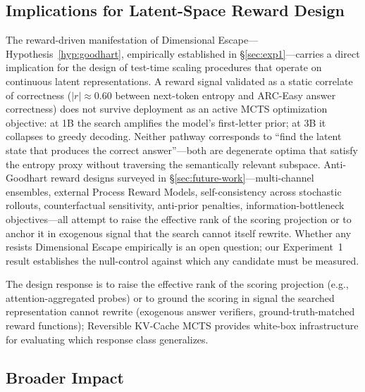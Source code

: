 \documentclass{article}
\begin{document}
\subsection{Implications for Latent-Space Reward Design}\label{sec:discussion-implications}

The reward-driven manifestation of Dimensional Escape---Hypothesis~\ref{hyp:goodhart}, empirically established in §\ref{sec:exp1}---carries a direct implication for the design of test-time scaling procedures that operate on continuous latent representations. A reward signal validated as a static correlate of correctness ($|r| \approx 0.60$ between next-token entropy and ARC-Easy answer correctness) does not survive deployment as an active MCTS optimization objective: at 1B the search amplifies the model's first-letter prior; at 3B it collapses to greedy decoding. Neither pathway corresponds to ``find the latent state that produces the correct answer''---both are degenerate optima that satisfy the entropy proxy without traversing the semantically relevant subspace. Anti-Goodhart reward designs surveyed in §\ref{sec:future-work}---multi-channel ensembles, external Process Reward Models, self-consistency across stochastic rollouts, counterfactual sensitivity, anti-prior penalties, information-bottleneck objectives---all attempt to raise the effective rank of the scoring projection or to anchor it in exogenous signal that the search cannot itself rewrite. Whether any resists Dimensional Escape empirically is an open question; our Experiment~1 result establishes the null-control against which any candidate must be measured.

The design response is to raise the effective rank of the scoring projection (e.g., attention-aggregated probes) or to ground the scoring in signal the searched representation cannot rewrite (exogenous answer verifiers, ground-truth-matched reward functions); Reversible KV-Cache MCTS provides white-box infrastructure for evaluating which response class generalizes.

\subsection{Broader Impact}
\end{document}
